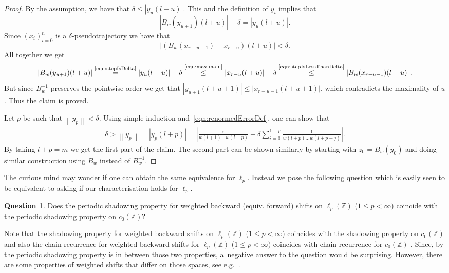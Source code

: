 \documentclass[11pt,a4paper]{amsart}
\theoremstyle{definition}
\newtheorem{question}[theorem]{Question}
\newcommand{\Z}{\mathbb{Z}}
\newcommand{\abs}[1]{\left| #1 \right|}
\newcommand{\norm}[1]{\left\| #1 \right\|}
\newcommand{\eqNote}[1]{\stackrel{\text{#1}}{=}}
\newcommand{\leqNote}[1]{\stackrel{\text{#1}}{\leq}}
\begin{document}
\begin{proof}
		By the assumption, we have that \(\delta \leq \abs{y_u(l+u)}\). This and the definition of \(y_i\) implies that
		\begin{equation} \label{eqn:stepIsDelta}
			\abs{B_w(y_{u+1})(l+u)}+\delta = \abs{y_{u}(l+u)}.    
		\end{equation}
		Since \((x_i)_{i=0}^{n}\) is a \(\delta\)-pseudotrajectory we have that
		\begin{equation} \label{eqn:stepIsLessThanDelta}
			\abs{(B_w(x_{r-u-1})-x_{r-u})(l+u)} < \delta.
		\end{equation}
		All together we get
		\begin{equation*}
			\abs{B_w(y_{u+1})(l+u)}
			\eqNote{\eqref{eqn:stepIsDelta}} \abs{y_u(l+u)}-\delta
			\leqNote{\eqref{eqn:maximalu}} \abs{x_{r-u}(l+u)}-\delta
			\leqNote{\eqref{eqn:stepIsLessThanDelta}} \abs{B_w(x_{r-u-1})(l+u)}.
		\end{equation*}
		But since \(B^{-1}_w\) preserves the pointwise order we get that \(\abs{y_{u+1}(l+u+1)} \leq \abs{x_{r-u-1}(l+u+1)}\), which contradicts the maximality of \(u\). Thus the claim is proved.
		
		
		Let \(p\) be such that \(\norm{y_p} < \delta\). Using simple induction and~\eqref{eqn:renormedErrorDef}, one can show that
		\begin{align*}
			\delta > \norm{y_p} = \abs{y_p(l+p)} = \abs{\frac{\varepsilon}{w(l+1)\dots w(l+p)}- \delta \sum_{i=0}^{1-p}\frac{1}{w(l+p) \dots w(l+p+j)}}. 
		\end{align*}
		By taking \(l+p = m\) we get the first part of the claim. The second part can be shown similarly by starting with \(z_0 = B_w(y_0)\) and doing similar construction using \(B_w\) instead of \(B^{-1}_w\).
	\end{proof}
	
	The curious mind may wonder if one can obtain the same equivalence for $\ell_p$. Instead we pose the following question which is easily seen to be equivalent to asking if our characterisation holds for $\ell_p$.
	\begin{question}
		Does the periodic shadowing property for weighted backward (equiv. forward) shifts on \(\ell_p(\Z)\) (\(1 \leq p < \infty\)) coincide with the periodic shadowing property on \(c_0(\Z)\)?
	\end{question}
	Note that the shadowing property for weighted backward shifts on \(\ell_p(\Z)\) (\(1 \leq p < \infty\)) coincides with the shadowing property on \(c_0(\Z)\) \cite[Theorem 18]{Shadowing_structural_stability} and also the chain recurrence for weighted backward shifts for \(\ell_p(\Z)\) (\(1 \leq p < \infty)\) coincides with chain recurrence for \(c_0(\Z)\) \cite[Theorem 14]{Shadowing_and_chain_rec}. Since, by  the periodic shadowing property is in between those two properties, a~negative answer to the question would be surprising. However, there are some properties of weighted shifts that differ on those spaces, see e.g.~\cite{Chaos_and_frequentl_hypercyclicity_for_weighted_shifts}.
	
	
	
	
\end{document}
